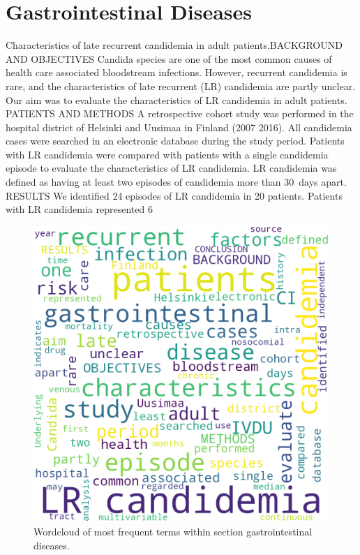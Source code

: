 \documentclass{qqtarticle}
\begin{document}
    \section{Gastrointestinal Diseases}
        Characteristics of late recurrent candidemia in adult patients.BACKGROUND AND OBJECTIVES  Candida species are one of the most common causes of health care associated bloodstream infections. However, recurrent candidemia is rare, and the characteristics of late recurrent (LR) candidemia are partly unclear. Our aim was to evaluate the characteristics of LR candidemia in adult patients. PATIENTS AND METHODS  A retrospective cohort study was performed in the hospital district of Helsinki and Uusimaa in Finland (2007 2016). All candidemia cases were searched in an electronic database during the study period. Patients with LR candidemia were compared with patients with a single candidemia episode to evaluate the characteristics of LR candidemia. LR candidemia was defined as having at least two episodes of candidemia more than 30 days apart. RESULTS  We identified 24 episodes of LR candidemia in 20 patients. Patients with LR candidemia represented 6%

        \begin{figure}[H]
            \centering
            \includegraphics[width=.75\linewidth]{img/gastrointestinaldiseases.png}
            \caption{Wordcloud of most frequent terms within section gastrointestinal diseases.}
            \label{fig:wcl_gastrointestinaldiseases}
        \end{figure}
\end{document}
